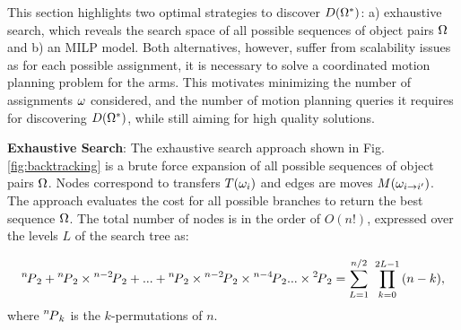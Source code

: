 This section highlights two optimal strategies to discover $\D(\scoma^*)$: a) exhaustive search, which reveals the search space of all possible sequences of object pairs $ \scoma $ and b) an MILP model. Both alternatives, however, suffer from scalability issues as for each possible assignment, it is necessary to solve a coordinated motion planning problem for the arms. This motivates minimizing the number of assignments $\coma$ considered, and the number of motion planning queries it requires for discovering $\D(\scoma^*)$, while still aiming for high quality solutions.

\noindent\textbf{Exhaustive Search}: The exhaustive search approach shown in Fig. \ref{fig:backtracking} is a brute force expansion of all possible sequences of object pairs $ \scoma $. Nodes correspond to transfers $T(\coma_i)$ and edges are moves $M(\coma_{i\rightarrow i{^\prime}})$. The approach evaluates the cost for all possible branches to return the best sequence $\scoma$. The total number of nodes is in the order of $O(n!)$, expressed over the levels $L$ of the search tree as: 

\vspace{-0.25in}
\begin{equation*}
{\permu[n]{2}} + {\permu[n]{2}}\times{\permu[n-2]{2}} + ... + {\permu[n]{2}}\times{\permu[n-2]{2}}\times{\permu[n-4]{2}}...\times{\permu[2]{2}} =\sum_{L=1}^{n/2} {\ \prod_{k=0}^{2L-1}{(n-k)}},
\vspace{-0.15in}
\end{equation*}
where $\permu[n]{k}$ is the $k$-permutations of $n$.  

